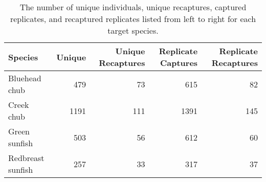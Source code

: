 \begin{table}[ht]
\centering
\caption{The number of unique individuals, unique recaptures, captured replicates, and recaptured replicates listed from left to right for each target species.} 
\label{tab:capture}
\begin{tabular}{lrrrr}
  \hline
Species & Unique & Unique Recaptures & Replicate Captures & Replicate Recaptures \\ 
  \hline
Bluehead chub & 479 &  73 & 615 &  82 \\ 
  Creek chub & 1191 & 111 & 1391 & 145 \\ 
  Green sunfish & 503 &  56 & 612 &  60 \\ 
  Redbreast sunfish & 257 &  33 & 317 &  37 \\ 
   \hline
\end{tabular}
\end{table}
